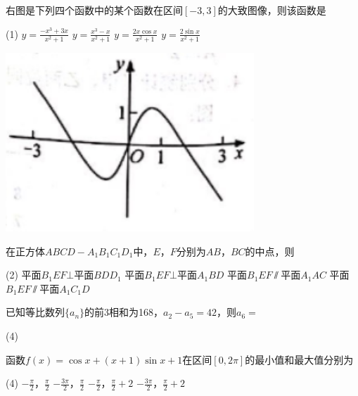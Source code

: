 \documentclass[12pt,space]{ctexart} %
\begin{document}
\begin{enumerate}[itemsep=0.2em,topsep=0pt]
  \begin{minipage}[h][24ex][t]{.70\textwidth}
    \item 右图是下列四个函数中的某个函数在区间$[-3,3]$的大致图像，则该函数是
    \begin{tasks}(1)
      \task  $y=\displaystyle{\frac{-x^{3}+3x}{x^{2}+1}}$
      \task  $y=\displaystyle{\frac{x^{3}-x}{x^{2}+1}}$
      \task  $y=\displaystyle{\frac{2x\cos x}{x^{2}+1}}$
      \task  $y=\displaystyle{\frac{2\sin x}{x^{2}+1}}$
    \end{tasks}
  \end{minipage}
  \begin{minipage}[h][24ex][t]{.30\textwidth}
    \flushright
    \vspace{3em}
    \includegraphics[width=0.7\textwidth]{Image/ii-w-8.png}
    \hspace{2em}
  \end{minipage}

  \item 在正方体$ABCD-A_1B_1C_1D_1$中，$E$，$F$分别为$AB$，$BC$的中点，则
  \begin{tasks}(2)
    \task 平面$B_1EF\bot $平面$BDD_1$
    \task 平面$B_1EF\bot $平面$A_1BD$
    \task 平面$B_1EF\varparallel$平面$A_1AC$
    \task 平面$B_1EF\varparallel$平面$A_1C_1D$
  \end{tasks}

  \item 已知等比数列$\{a_n\}$的前3相和为168，$a_2-a_5=42$，则$a_6=$
  \begin{tasks}(4)
       
  \end{tasks}

  \item 函数$f(x)=\cos x+(x+1)\sin x+1$在区间$[0, 2\pi]$的最小值和最大值分别为
  \begin{tasks}(4)
    \task $\displaystyle{-\frac{\pi}{2}}$，$\displaystyle{\frac{\pi}{2}}$
    \task $\displaystyle{-\frac{3\pi}{2}}$，$\displaystyle{\frac{\pi}{2}}$
    \task $\displaystyle{-\frac{\pi}{2}}$，$\displaystyle{\frac{\pi}{2}+2}$
    \task $\displaystyle{-\frac{3\pi}{2}}$，$\displaystyle{\frac{\pi}{2}+2}$
  \end{tasks}


\end{enumerate}
\end{document}

